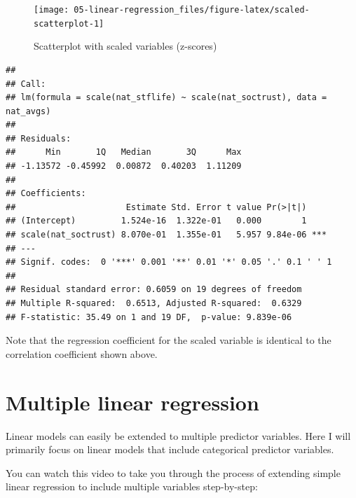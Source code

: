 \documentclass[
]{book}
\newenvironment{Shaded}{\begin{snugshade}}{\end{snugshade}}
\newcommand{\DataTypeTok}[1]{\textcolor[rgb]{0.13,0.29,0.53}{#1}}
\newcommand{\KeywordTok}[1]{\textcolor[rgb]{0.13,0.29,0.53}{\textbf{#1}}}
\newcommand{\NormalTok}[1]{#1}
\newcommand{\OperatorTok}[1]{\textcolor[rgb]{0.81,0.36,0.00}{\textbf{#1}}}
\newcommand{\StringTok}[1]{\textcolor[rgb]{0.31,0.60,0.02}{#1}}
\begin{document}
\begin{figure}

{\centering \texttt{[image: 05-linear-regression\_files/figure-latex/scaled-scatterplot-1]} 

}

\caption{Scatterplot with scaled variables (z-scores)}\label{fig:scaled-scatterplot}
\end{figure}

\begin{Shaded}
\end{Shaded}

\begin{verbatim}
## 
## Call:
## lm(formula = scale(nat_stflife) ~ scale(nat_soctrust), data = nat_avgs)
## 
## Residuals:
##      Min       1Q   Median       3Q      Max 
## -1.13572 -0.45992  0.00872  0.40203  1.11209 
## 
## Coefficients:
##                      Estimate Std. Error t value Pr(>|t|)    
## (Intercept)         1.524e-16  1.322e-01   0.000        1    
## scale(nat_soctrust) 8.070e-01  1.355e-01   5.957 9.84e-06 ***
## ---
## Signif. codes:  0 '***' 0.001 '**' 0.01 '*' 0.05 '.' 0.1 ' ' 1
## 
## Residual standard error: 0.6059 on 19 degrees of freedom
## Multiple R-squared:  0.6513,	Adjusted R-squared:  0.6329 
## F-statistic: 35.49 on 1 and 19 DF,  p-value: 9.839e-06
\end{verbatim}

Note that the regression coefficient for the scaled variable is
identical to the correlation coefficient shown above.

\hypertarget{multiple-linear-regression}{%
\section{Multiple linear regression}\label{multiple-linear-regression}}

Linear models can easily be extended to multiple predictor variables.
Here I will primarily focus on linear models that include categorical
predictor variables.

You can watch this video to take you through the process of extending
simple linear regression to include multiple variables step-by-step:
\end{document}
